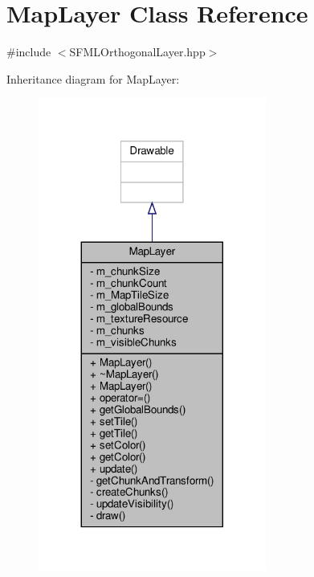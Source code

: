 \hypertarget{classMapLayer}{}\section{Map\+Layer Class Reference}
\label{classMapLayer}


{\ttfamily \#include $<$S\+F\+M\+L\+Orthogonal\+Layer.\+hpp$>$}



Inheritance diagram for Map\+Layer\+:
\nopagebreak
\begin{figure}[H]
\begin{center}
\leavevmode
\includegraphics[width=212pt]{classMapLayer__inherit__graph}
\end{center}
\end{figure}


